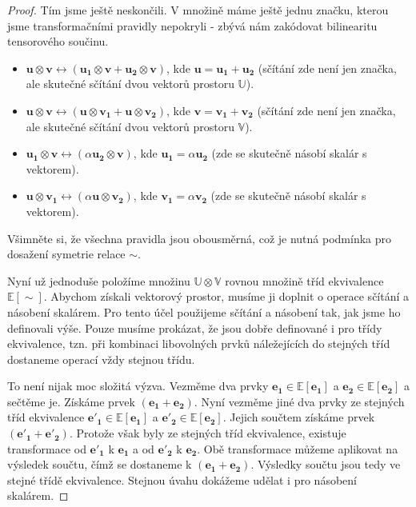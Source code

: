 \documentclass[a5paper,12pt]{amsbook}
\theoremstyle{definition}
\newcommand{\myvec}[1]{\bm{#1}}
\newcommand{\myspace}[1]{\mathbb{#1}}
\begin{document}
\begin{proof}
Tím jsme ještě neskončili. V množině máme ještě jednu značku, kterou jsme transformačními
pravidly nepokryli - zbývá nám zakódovat bilinearitu tensorového součinu.
\begin{itemize}
\item $\myvec{u}\otimes\myvec{v} 
    \leftrightarrow (\myvec{u_1}\otimes\myvec{v} + \myvec{u_2}\otimes\myvec{v})$, kde
    $\myvec{u} = \myvec{u_1} + \myvec{u_2}$ (sčítání zde není jen značka, ale skutečné
    sčítání dvou vektorů prostoru $\myspace{U}$).
\item $\myvec{u}\otimes\myvec{v} 
    \leftrightarrow (\myvec{u}\otimes\myvec{v_1} + \myvec{u}\otimes\myvec{v_2})$, kde
    $\myvec{v} = \myvec{v_1} + \myvec{v_2}$ (sčítání zde není jen značka, ale skutečné
    sčítání dvou vektorů prostoru $\myspace{V}$).
\item $\myvec{u_1}\otimes\myvec{v} \leftrightarrow (\alpha\myvec{u_2}\otimes\myvec{v})$,
	kde $\myvec{u_1} = \alpha\myvec{u_2}$ (zde se skutečně násobí skalár s vektorem).
\item $\myvec{u}\otimes\myvec{v_1} \leftrightarrow (\alpha\myvec{u}\otimes\myvec{v_2})$,
    kde $\myvec{v_1} = \alpha\myvec{v_2}$ (zde se skutečně násobí skalár s vektorem).
\end{itemize}

Všimněte si, že všechna pravidla jsou obousměrná, což je nutná podmínka pro dosažení
symetrie relace $\sim$.

Nyní už jednoduše položíme množinu $\myspace{U}\otimes\myspace{V}$ rovnou množině
tříd ekvivalence $\myspace{E}[\sim]$. Abychom získali vektorový prostor, musíme ji
doplnit o operace sčítání a násobení skalárem. Pro tento účel použijeme sčítání
a násobení tak, jak jsme ho definovali výše. Pouze musíme prokázat, že jsou dobře
definované i pro třídy ekvivalence, tzn. při kombinaci libovolných prvků náležejících
do stejných tříd dostaneme operací vždy stejnou třídu.

To není nijak moc složitá výzva. Vezměme dva prvky $\myvec{e_1}\in\myspace{E}[\myvec{e_1}]$
a $\myvec{e_2}\in\myspace{E}[\myvec{e_2}]$ a sečtěme je. Získáme prvek
$(\myvec{e_1} + \myvec{e_2})$. Nyní vezměme jiné dva prvky ze stejných tříd ekvivalence
$\myvec{e'_1}\in\myspace{E}[\myvec{e_1}]$ a $\myvec{e'_2}\in\myspace{E}[\myvec{e_2}]$.
Jejich součtem získáme prvek $(\myvec{e'_1} + \myvec{e'_2})$. Protože však byly ze stejných
tříd ekvivalence, existuje transformace od $\myvec{e'_1}$ k $\myvec{e_1}$ a
od $\myvec{e'_2}$ k $\myvec{e_2}$. Obě transformace můžeme aplikovat na výsledek
součtu, čímž se dostaneme k $(\myvec{e_1} + \myvec{e_2})$. Výsledky součtu jsou
tedy ve stejné třídě ekvivalence. Stejnou úvahu dokážeme udělat i pro násobení
skalárem.


\end{proof}
\end{document}

